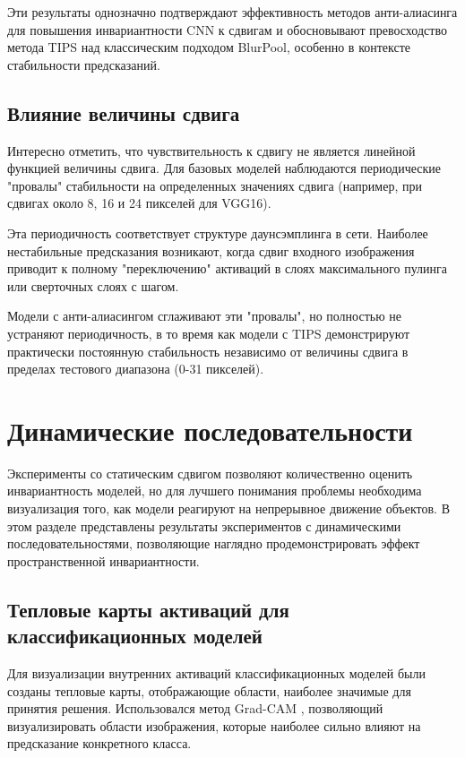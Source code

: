 Эти результаты однозначно подтверждают эффективность методов анти-алиасинга для повышения инвариантности CNN к сдвигам и обосновывают превосходство метода TIPS над классическим подходом BlurPool, особенно в контексте стабильности предсказаний.

\subsection{Влияние величины сдвига}
\label{experiments:static:shift_magnitude}

Интересно отметить, что чувствительность к сдвигу не является линейной функцией величины сдвига. Для базовых моделей наблюдаются периодические "провалы" стабильности на определенных значениях сдвига (например, при сдвигах около 8, 16 и 24 пикселей для VGG16).

Эта периодичность соответствует структуре даунсэмплинга в сети. Наиболее нестабильные предсказания возникают, когда сдвиг входного изображения приводит к полному "переключению" активаций в слоях максимального пулинга или сверточных слоях с шагом.

Модели с анти-алиасингом сглаживают эти "провалы", но полностью не устраняют периодичность, в то время как модели с TIPS демонстрируют практически постоянную стабильность независимо от величины сдвига в пределах тестового диапазона (0-31 пикселей).

\section{Динамические последовательности}
\label{experiments:dynamic}

Эксперименты со статическим сдвигом позволяют количественно оценить инвариантность моделей, но для лучшего понимания проблемы необходима визуализация того, как модели реагируют на непрерывное движение объектов. В этом разделе представлены результаты экспериментов с динамическими последовательностями, позволяющие наглядно продемонстрировать эффект пространственной инвариантности.

\subsection{Тепловые карты активаций для классификационных моделей}
\label{experiments:dynamic:heatmaps}

Для визуализации внутренних активаций классификационных моделей были созданы тепловые карты, отображающие области, наиболее значимые для принятия решения. Использовался метод Grad-CAM \cite{Selvaraju2017}, позволяющий визуализировать области изображения, которые наиболее сильно влияют на предсказание конкретного класса.

